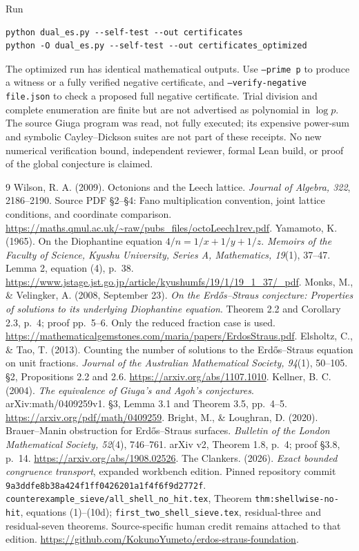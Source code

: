 \documentclass[11pt]{article}
\theoremstyle{definition}\newtheorem{definition}[theorem]{Definition}
\theoremstyle{remark}\newtheorem{remark}[theorem]{Remark}
\begin{document}
Run
\begin{verbatim}
python dual_es.py --self-test --out certificates
python -O dual_es.py --self-test --out certificates_optimized
\end{verbatim}
The optimized run has identical mathematical outputs. Use
\texttt{--prime p} to produce a witness or a fully verified negative
certificate, and \texttt{--verify-negative file.json} to check a proposed
full negative certificate. Trial division and complete enumeration are
finite but are not advertised as polynomial in $\log p$.
The source Giuga program was read, not fully executed; its expensive
power-sum and symbolic Cayley--Dickson suites are not part of these receipts.
No new numerical verification bound, independent reviewer, formal Lean
build, or proof of the global conjecture is claimed.

\begin{thebibliography}{9}
 Wilson, R. A. (2009). Octonions and the Leech lattice.
\emph{Journal of Algebra, 322}, 2186--2190. Source PDF \S2--\S4:
Fano multiplication convention, joint lattice conditions, and coordinate comparison.
\url{https://maths.qmul.ac.uk/~raw/pubs_files/octoLeech1rev.pdf}.
 Yamamoto, K. (1965). On the Diophantine equation
$4/n=1/x+1/y+1/z$. \emph{Memoirs of the Faculty of Science, Kyushu
University, Series A, Mathematics, 19}(1), 37--47.
Lemma 2, equation (4), p.~38.
\url{https://www.jstage.jst.go.jp/article/kyushumfs/19/1/19_1_37/_pdf}.
 Monks, M., \& Velingker, A. (2008, September 23).
\emph{On the Erd\H{o}s--Straus conjecture: Properties of solutions to its
underlying Diophantine equation}. Theorem 2.2 and Corollary 2.3, p.~4;
proof pp.~5--6. Only the reduced fraction case is used.
\url{https://mathematicalgemstones.com/maria/papers/ErdosStraus.pdf}.
 Elsholtz, C., \& Tao, T. (2013). Counting the number of solutions
to the Erd\H{o}s--Straus equation on unit fractions.
\emph{Journal of the Australian Mathematical Society, 94}(1), 50--105.
\S2, Propositions 2.2 and 2.6. \url{https://arxiv.org/abs/1107.1010}.
 Kellner, B. C. (2004). \emph{The equivalence of Giuga's
and Agoh's conjectures}. arXiv:math/0409259v1.
\S3, Lemma 3.1 and Theorem 3.5, pp.~4--5.
\url{https://arxiv.org/pdf/math/0409259}.
 Bright, M., \& Loughran, D. (2020). Brauer--Manin obstruction
for Erd\H{o}s--Straus surfaces. \emph{Bulletin of the London Mathematical
Society, 52}(4), 746--761. arXiv v2, Theorem 1.8, p.~4; proof \S3.8,
p.~14. \url{https://arxiv.org/abs/1908.02526}.
 The Clankers. (2026). \emph{Exact bounded congruence
transport}, expanded workbench edition. Pinned repository commit
\texttt{9a3ddfe8b38a424f1ff0426201a1f4f6f9d2772f}.
\texttt{counterexample\_sieve/all\_shell\_no\_hit.tex},
Theorem \texttt{thm:shellwise-no-hit}, equations (1)--(10d);
\texttt{first\_two\_shell\_sieve.tex}, residual-three and residual-seven
theorems. Source-specific human credit remains attached to that edition.
\url{https://github.com/KokunoYumeto/erdos-straus-foundation}.
\end{thebibliography}
\end{document}
